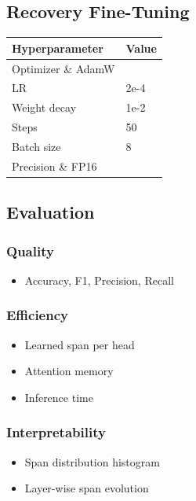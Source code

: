 \subsection{Recovery Fine-Tuning}

\begin{table}[H]
\centering
\small
\begin{tabular}{ll}
\toprule
\textbf{Hyperparameter} & \textbf{Value} \\
\midrule
Optimizer \& AdamW \\
LR & 2e-4 \\
Weight decay & 1e-2 \\
Steps & 50 \\
Batch size & 8 \\
Precision \& FP16 \\
\bottomrule
\end{tabular}
\end{table}

\subsection{Evaluation}

\subsubsection{Quality}
\begin{itemize}
\item Accuracy, F1, Precision, Recall

\end{itemize}
\subsubsection{Efficiency}
\begin{itemize}
\item Learned span per head
\item Attention memory
\item Inference time

\end{itemize}
\subsubsection{Interpretability}
\begin{itemize}
\item Span distribution histogram
\item Layer-wise span evolution

\end{itemize}
